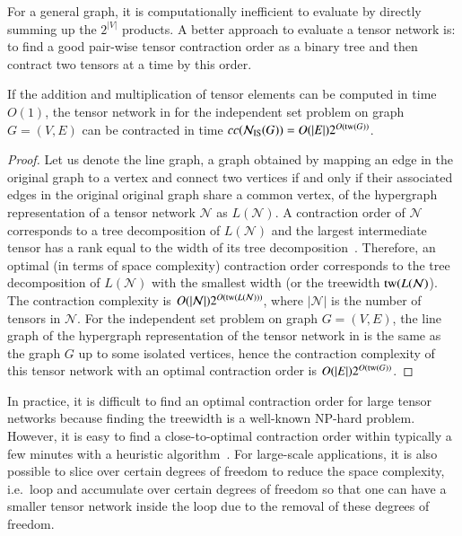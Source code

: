 \documentclass[review, onefignum, onetabnum]{siamart190516}
\begin{document}
For a general graph, it is computationally inefficient to evaluate  by directly summing up the $2^{|V|}$ products.
A better approach to evaluate a tensor network is: to find a good pair-wise tensor contraction order as a binary tree and then contract two tensors at a time by this order.
\begin{theorem}\label{thm:complexreal}
    If the addition and multiplication of tensor elements can be computed in time $O(1)$,
    the tensor network in  for the independent set problem on graph $G = (V,E)$ can be contracted in time $cc({\mathcal{N}_{\rm IS}(G)}) = O(|E|)2^{O({\rm tw}(G))}$.
\end{theorem}
\begin{proof}
Let us denote the line graph, a graph obtained by mapping an edge in the original graph to a vertex and connect two vertices if and only if their associated edges in the original original graph share a common vertex, of the hypergraph representation of a tensor network $\mathcal{N}$ as $L(\mathcal{N})$.
A contraction order of $\mathcal{N}$ corresponds to a tree decomposition of $L(\mathcal{N})$ and the largest intermediate tensor has a rank equal to the width of its tree decomposition~\cite{Markov2008}.
Therefore, an optimal (in terms of space complexity) contraction order corresponds to the tree decomposition of $L(\mathcal{N})$ with the smallest width (or the treewidth ${\rm tw}(L(\mathcal{N})$). The contraction complexity is $O(|\mathcal{N}|)2^{O({\rm tw}(L(\mathcal{N})))}$, where $|\mathcal{N}|$ is the number of tensors in $\mathcal{N}$.
For the independent set problem on graph $G = (V, E)$, the line graph of the hypergraph representation of the tensor network in  is the same as the graph $G$ up to some isolated vertices, hence the contraction complexity of this tensor network with an optimal contraction order is $O(|E|)2^{O({\rm tw}(G))}$.
\end{proof}
 
In practice, it is difficult to find an optimal contraction order for large tensor networks because finding the treewidth is a well-known NP-hard problem.
However, it is easy to find a close-to-optimal contraction order within typically a few minutes with a heuristic algorithm~\cite{Kourtis2019, Kalachev2021}.
For large-scale applications, it is also possible to slice over certain degrees of freedom to reduce the space complexity, i.e.\
loop and accumulate over certain degrees of freedom so that one can have a smaller tensor network inside the loop due to the removal of these degrees of freedom.
\end{document}
